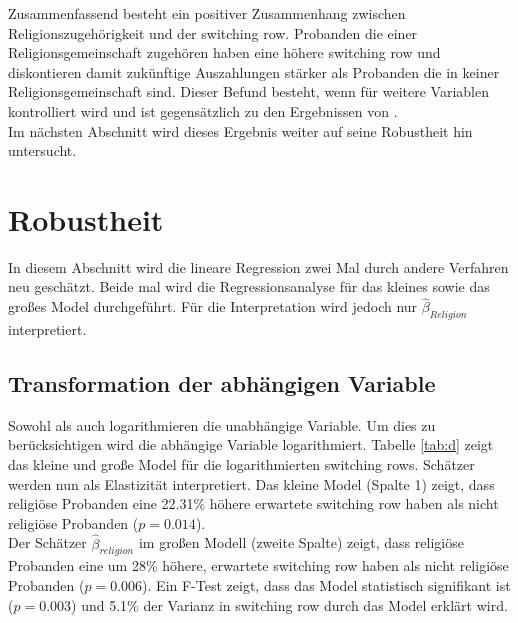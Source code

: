 \documentclass[11pt,a4paper]{article}
\begin{document}






Zusammenfassend besteht ein positiver Zusammenhang zwischen Religionszugehörigkeit und der switching row. Probanden die einer Religionsgemeinschaft zugehören haben eine höhere switching row und  diskontieren damit zukünftige Auszahlungen stärker als Probanden die in keiner Religionsgemeinschaft sind. Dieser Befund besteht, wenn für weitere Variablen kontrolliert wird und ist gegensätzlich zu den Ergebnissen von \textcite{carter2012religious,benjamin2013religious, thornton2015divine}.\\

Im nächsten Abschnitt wird dieses Ergebnis weiter auf seine Robustheit hin untersucht. 

\section{Robustheit}
In diesem Abschnitt wird die lineare Regression zwei Mal durch andere Verfahren neu geschätzt. Beide mal wird die Regressionsanalyse für das kleines sowie das großes Model durchgeführt. Für die Interpretation wird jedoch nur $\hat{\beta}_{Religion}$ interpretiert. 
\subsection{Transformation der abhängigen Variable}
Sowohl \textcite{benjamin2013religious} als auch \textcite{thornton2015divine} logarithmieren die unabhängige Variable. Um dies zu berücksichtigen wird die abhängige Variable logarithmiert. Tabelle \ref{tab:d} zeigt das kleine und große Model für die logarithmierten switching rows. Schätzer werden  nun als Elastizität interpretiert. Das kleine Model (Spalte 1) zeigt, dass religiöse Probanden eine 22.31\% höhere erwartete switching row haben als nicht religiöse Probanden ($p = 0.014$).\\
Der Schätzer $\hat{\beta}_{religion}$ im großen Modell (zweite Spalte) zeigt, dass religiöse Probanden eine um 28\% höhere, erwartete switching row haben als nicht religiöse Probanden ($p = 0.006$). Ein F-Test zeigt, dass das Model statistisch signifikant ist ($p = 0.003$) und 5.1\% der Varianz in switching row durch das Model erklärt wird.\\
\end{document}
